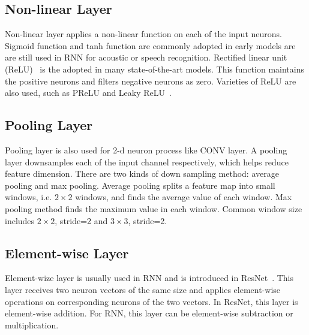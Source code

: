 \subsection{Non-linear Layer}
Non-linear layer applies a non-linear function on each of the input neurons. Sigmoid function and tanh function are commonly adopted in early models are are still used in RNN for acoustic or speech recognition. Rectified linear unit (ReLU)~\cite{krizhevsky2012imagenet} is the adopted in many state-of-the-art models. This function maintains the positive neurons and filters negative neurons as zero. Varieties of ReLU are also used, such as PReLU and Leaky ReLU~\cite{xu2015empirical}.

\subsection{Pooling Layer}
Pooling layer is also used for 2-d neuron process like CONV layer. A pooling layer downsamples each of the input channel respectively, which helps reduce feature dimension. There are two kinds of down sampling method: average pooling and max pooling. Average pooling splits a feature map into small windows, i.e. $2\times2$ windows, and finds the average value of each window. Max pooling method finds the maximum value in each window. Common window size includes $2\times2$, stride=2 and $3\times3$, stride=2.

\subsection{Element-wise Layer}
Element-wize layer is usually used in RNN and is introduced in ResNet~\cite{he2016deep}. This layer receives two neuron vectors of the same size and applies element-wise operations on corresponding neurons of the two vectors. In ResNet, this layer is element-wise addition. For RNN, this layer can be element-wise subtraction or multiplication.

